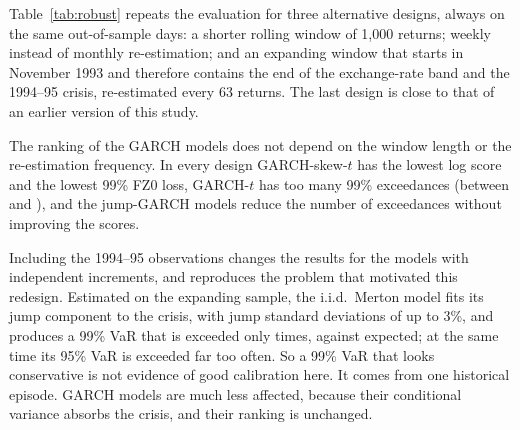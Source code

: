 Table~\ref{tab:robust} repeats the evaluation for three alternative designs, always on the same \oosN{} out-of-sample days: a shorter rolling window of 1,000 returns; weekly instead of monthly re-estimation; and an expanding window that starts in November 1993 and therefore contains the end of the exchange-rate band and the 1994--95 crisis, re-estimated every 63 returns. The last design is close to that of an earlier version of this study.

\begin{table}[t]
\centering\small
\caption{Robustness of the out-of-sample comparison to the estimation design. NLS: mean negative log score (bold: lowest). Exc.\ 99\%: exceedances of the 99\% VaR (expected \expNinetyNine). FZ0 99\%: mean joint VaR--ES loss at the 99\% level.}\label{tab:robust}
\resizebox{\linewidth}{!}{}
\end{table}

The ranking of the GARCH models does not depend on the window length or the re-estimation frequency. In every design GARCH-skew-$t$ has the lowest log score and the lowest 99\% FZ0 loss, GARCH-$t$ has too many 99\% exceedances (between \excNNGarchT{} and \robExcWindowOneZeroZeroZeroGarchT), and the jump-GARCH models reduce the number of exceedances without improving the scores.

Including the 1994--95 observations changes the results for the models with independent increments, and reproduces the problem that motivated this redesign. Estimated on the expanding sample, the i.i.d.\ Merton model fits its jump component to the crisis, with jump standard deviations of up to 3\%, and produces a 99\% VaR that is exceeded only \robExcExpandingOneNineNineThreeMerton{} times, against \expNinetyNine{} expected; at the same time its 95\% VaR is exceeded far too often. So a 99\% VaR that looks conservative is not evidence of good calibration here. It comes from one historical episode. GARCH models are much less affected, because their conditional variance absorbs the crisis, and their ranking is unchanged.

